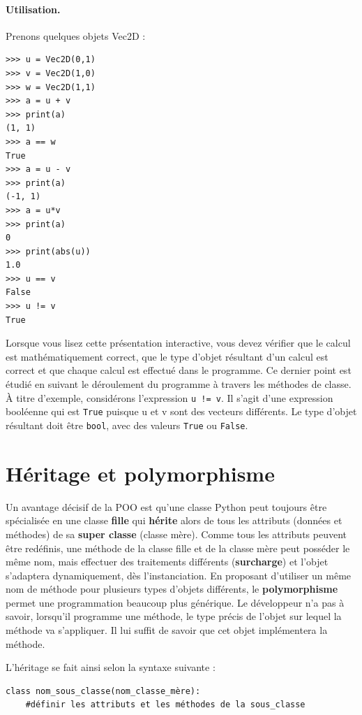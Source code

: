 \documentclass[a4paper,11pt]{article}
\theoremstyle{mytheor}
\begin{document}
\paragraph{Utilisation.}
Prenons quelques objets Vec2D :
\begin{Verbatim}[frame=leftline, framerule=1.5mm, rulecolor=\color{blue}]
>>> u = Vec2D(0,1)
>>> v = Vec2D(1,0)
>>> w = Vec2D(1,1)
>>> a = u + v
>>> print(a)
(1, 1)
>>> a == w
True
>>> a = u - v
>>> print(a)
(-1, 1)
>>> a = u*v
>>> print(a)
0
>>> print(abs(u))
1.0
>>> u == v
False
>>> u != v
True
\end{Verbatim}

Lorsque vous lisez cette présentation interactive, vous devez vérifier que le calcul est mathématiquement correct, que le type d'objet résultant d'un calcul est correct et que chaque calcul est effectué dans le programme. Ce dernier point est étudié en suivant le déroulement du programme à travers les méthodes de classe. À titre d'exemple, considérons l'expression \Verb?u != v?. Il s'agit d'une expression booléenne qui est \texttt{True} puisque u et v sont des vecteurs différents. Le type d'objet résultant doit être \texttt{bool}, avec des valeurs \texttt{True} ou \texttt{False}.

\section{Héritage et polymorphisme}
Un avantage décisif de la POO est qu'une classe Python peut toujours être spécialisée en une classe \textbf{fille} qui \textbf{hérite} alors de tous les attributs (données et méthodes) de sa \textbf{super classe} (classe mère). Comme tous les attributs peuvent être redéfinis, une méthode de la classe fille et de la classe mère peut posséder le même nom, mais effectuer des traitements différents (\textbf{surcharge}) et l'objet s'adaptera dynamiquement, dès l'instanciation. En proposant d'utiliser un même nom de méthode pour plusieurs types d'objets différents, le \textbf{polymorphisme} permet une programmation beaucoup plus générique. Le développeur n'a pas à savoir, lorsqu'il programme une méthode, le type précis de l'objet sur lequel la méthode va s'appliquer. Il lui suffit de savoir que cet objet implémentera la méthode.

L'héritage se fait ainsi selon la syntaxe suivante :

\begin{lstlisting}
class nom_sous_classe(nom_classe_mère):
	#définir les attributs et les méthodes de la sous_classe
\end{lstlisting}
\end{document}
